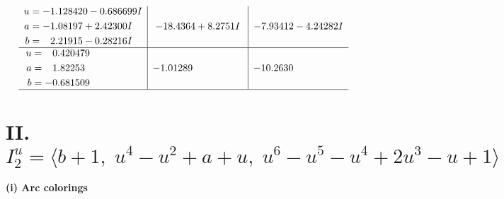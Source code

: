 \documentclass[1p]{elsarticle_modified}
\theoremstyle{definition}
\begin{document}
$$\begin{array}{c|c|c}
\begin{aligned}
u &= -1.128420 - 0.686699 I \\
a &= -1.08197 + 2.42300 I \\
b &= \phantom{-}2.21915 - 0.28216 I\end{aligned}
 & -18.4364 + 8.2751 I & -7.93412 - 4.24282 I \\ \hline\begin{aligned}
u &= \phantom{-}0.420479\phantom{ +0.000000I} \\
a &= \phantom{-}1.82253\phantom{ +0.000000I} \\
b &= -0.681509\phantom{ +0.000000I}\end{aligned}
 & -1.01289\phantom{ +0.000000I} & -10.2630\phantom{ +0.000000I}\\
 \hline 
 \end{array}$$\newpage\newpage\renewcommand{\arraystretch}{1}
\centering \section*{II. $I^u_{2}= \langle b+1,\;u^4- u^2+a+u,\;u^6- u^5- u^4+2 u^3- u+1 \rangle$}
\flushleft \textbf{(i) Arc colorings}\\
\end{document}
